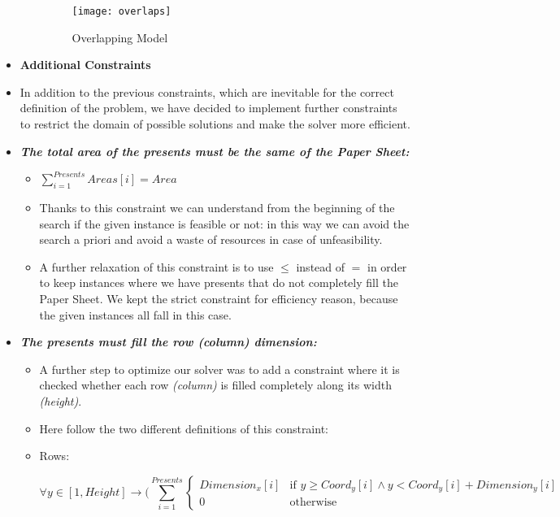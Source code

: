 \begin{itemize}
\begin{itemize}
		\begin{figure}[ht]
			\centering
			\texttt{[image: overlaps]}
			\caption{Overlapping Model}
			\label{fig:overlaps}
		\end{figure}
	\end{itemize}

	\newpage
	\item[] \textbf{Additional Constraints}
	\item[] In addition to the previous constraints, which are inevitable for the correct definition of the problem, we have decided to implement further constraints to restrict the domain of possible solutions and make the solver more efficient.
	\item \textbf{\textit{The total area of the presents must be the same of the Paper Sheet:}}
	\begin{itemize}
		\item[] $\sum_{i = 1}^{Presents}{Areas[i]} = Area$
		\item[] Thanks to this constraint we can understand from the beginning of the search if the given instance is feasible or not: in this way we can avoid the search a priori and avoid a waste of resources in case of unfeasibility.	
		\item[] A further relaxation of this constraint is to use $\leq$ instead of $=$ in order 
		to keep instances where we have presents that do not completely fill the Paper Sheet.  
		We kept the strict constraint for efficiency reason, because the given instances all fall
		in this case.
	\end{itemize}
	\item \textbf{\textit{The presents must fill the row (column) dimension:}}
	\begin{itemize}
		\item[] A further step to optimize our solver was to add a constraint where it is checked whether each row \textit{(column)} is filled completely along its width \textit{(height)}.
		\item[] Here follow the two different definitions of this constraint:
		\item[] Rows:
		\begin{adjustwidth}{-3.3cm}{}\begin{equation*}
			\forall y \in [1, Height] \rightarrow (\sum_{i = 1}^{Presents}{
				\begin{cases}
					Dimension_x[i] & \text{if } y \geq Coord_y[i] \wedge y < Coord_y[i] + Dimension_y[i] \\
					0 & \text{otherwise}

\end{cases}}
\end{equation*}
\end{adjustwidth}
\end{itemize}
\end{itemize}
